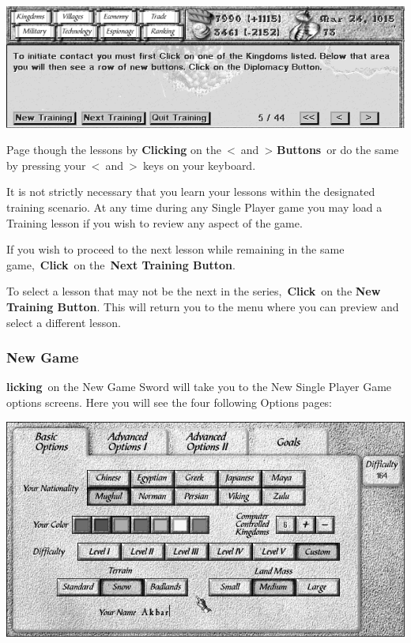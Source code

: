 \begin{center}
	\includegraphics[width=0.9\linewidth]{Ilesson}
\end{center}

Page though the lessons by \textbf{Clicking} on the \textless and \textgreater \hspace{1pt} \textbf{Buttons} or do the same by pressing your \textless and \textgreater keys on your keyboard.

It is not strictly necessary that you learn your lessons within the designated training scenario. At any time during any Single Player game you may load a Training lesson if you wish to review any aspect of the game.

If you wish to proceed to the next lesson while remaining in the same game, \textbf{Click} on the \textbf{Next Training Button}.

To select a lesson that may not be the next in the series, \textbf{Click} on the \textbf{New Training Button}. This will return you to the menu where you can preview and select a different lesson.

\subsubsection{New Game}


\textbf{licking} on the New Game Sword will take you to the New Single Player Game options screens. Here you will see the four following Options pages:

\begin{center}
	\includegraphics[width=0.9\linewidth]{Ibasicoptions}
\end{center}

